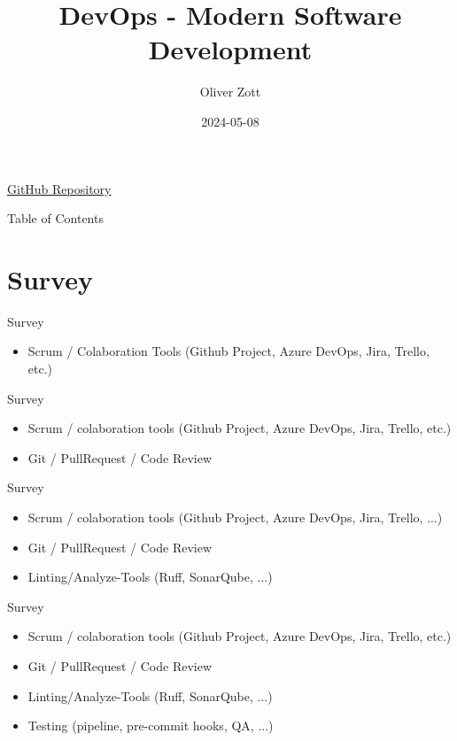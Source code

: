 \documentclass[10pt]{beamer}
\title{DevOps - Modern Software Development}
\author{Oliver Zott}
\date{2024-05-08}
\begin{document}

\begin{frame}
	\titlepage
	\vfill
    \centering
    \href{https://github.com/OliverZott/python-devops-example}{GitHub Repository}
\end{frame}

\begin{frame}{Table of Contents}
 	\tableofcontents
\end{frame}

\section{Survey}

\begin{frame}{Survey}
	\begin{itemize}
		\item Scrum / Colaboration Tools (Github Project, Azure DevOps, Jira, Trello, etc.)
	\end{itemize}
\end{frame}

\begin{frame}{Survey}
	\begin{itemize}
		\item Scrum / colaboration tools (Github Project, Azure DevOps, Jira, Trello, etc.)
		\item Git / PullRequest / Code Review
	\end{itemize}
\end{frame}

\begin{frame}{Survey}
	\begin{itemize}
		\item Scrum / colaboration tools (Github Project, Azure DevOps, Jira, Trello, ...)
		\item Git / PullRequest / Code Review
		\item Linting/Analyze-Tools (Ruff, SonarQube, ...)
	\end{itemize}
\end{frame}

\begin{frame}{Survey}
	\begin{itemize}
		\item Scrum / colaboration tools (Github Project, Azure DevOps, Jira, Trello, etc.)
		\item Git / PullRequest / Code Review
		\item Linting/Analyze-Tools (Ruff, SonarQube, ...)
		\item Testing (pipeline, pre-commit hooks, QA, ...)
	\end{itemize}
\end{frame}
\end{document}
